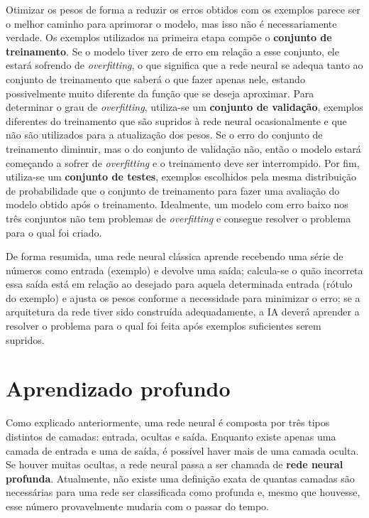 Otimizar os pesos de forma a reduzir os erros obtidos com os exemplos parece ser o melhor caminho para aprimorar o modelo, mas isso não é necessariamente verdade.
Os exemplos utilizados na primeira etapa compõe o \textbf{conjunto de treinamento}.
Se o modelo tiver zero de erro em relação a esse conjunto, ele estará sofrendo de \textit{overfitting}, o que significa que a rede neural se adequa tanto ao conjunto de treinamento que saberá o que fazer apenas nele, estando possivelmente muito diferente da função que se deseja aproximar.
Para determinar o grau de \textit{overfitting}, utiliza-se um \textbf{conjunto de validação}, exemplos diferentes do treinamento que são supridos à rede neural ocasionalmente e que não são utilizados para a atualização dos pesos.
Se o erro do conjunto de treinamento diminuir, mas o do conjunto de validação não, então o modelo estará começando a sofrer de \textit{overfitting} e o treinamento deve ser interrompido.
Por fim, utiliza-se um \textbf{conjunto de testes}, exemplos escolhidos pela mesma distribuição de probabilidade que o conjunto de treinamento para fazer uma avaliação do modelo obtido após o treinamento.
Idealmente, um modelo com erro baixo nos três conjuntos não tem problemas de \textit{overfitting} e consegue resolver o problema para o qual foi criado.

De forma resumida, uma rede neural clássica aprende recebendo uma série de números como entrada (exemplo) e devolve uma saída;
calcula-se o quão incorreta essa saída está em relação ao desejado para aquela determinada entrada (rótulo do exemplo) e ajusta os pesos conforme a necessidade para minimizar o erro;
se a arquitetura da rede tiver sido construída adequadamente, a IA deverá aprender a resolver o problema para o qual foi feita após exemplos suficientes serem supridos.


\section{Aprendizado profundo}
\label{sec:dl}

Como explicado anteriormente, uma rede neural é composta por três tipos distintos de camadas: entrada, ocultas e saída.
Enquanto existe apenas uma camada de entrada e uma de saída, é possível haver mais de uma camada oculta.
Se houver muitas ocultas, a rede neural passa a ser chamada de \textbf{rede neural profunda}.
Atualmente, não existe uma definição exata de quantas camadas são necessárias para uma rede ser classificada como profunda e, mesmo que houvesse, esse número provavelmente mudaria com o passar do tempo.

